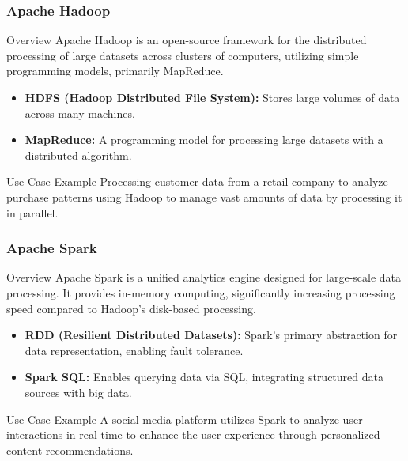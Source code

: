 \documentclass[aspectratio=169]{beamer}
\begin{document}
\begin{frame}[fragile]
    \frametitle{Apache Hadoop}
    
    \begin{block}{Overview}
    Apache Hadoop is an open-source framework for the distributed processing of large datasets across clusters of computers, utilizing simple programming models, primarily MapReduce.
    \end{block}
    
    \begin{itemize}
        \item \textbf{HDFS (Hadoop Distributed File System):} Stores large volumes of data across many machines.
        \item \textbf{MapReduce:} A programming model for processing large datasets with a distributed algorithm.
    \end{itemize}

    \begin{block}{Use Case Example}
    Processing customer data from a retail company to analyze purchase patterns using Hadoop to manage vast amounts of data by processing it in parallel.
    \end{block}
\end{frame}

\begin{frame}[fragile]
    \frametitle{Apache Spark}
    
    \begin{block}{Overview}
    Apache Spark is a unified analytics engine designed for large-scale data processing. It provides in-memory computing, significantly increasing processing speed compared to Hadoop's disk-based processing.
    \end{block}
    
    \begin{itemize}
        \item \textbf{RDD (Resilient Distributed Datasets):} Spark's primary abstraction for data representation, enabling fault tolerance.
        \item \textbf{Spark SQL:} Enables querying data via SQL, integrating structured data sources with big data.
    \end{itemize}

    \begin{block}{Use Case Example}
    A social media platform utilizes Spark to analyze user interactions in real-time to enhance the user experience through personalized content recommendations.
    \end{block}
\end{frame}
\end{document}
